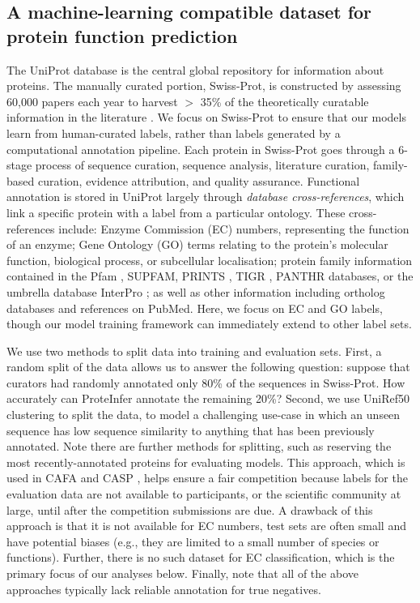 \subsection*{A machine-learning compatible dataset for protein function prediction}
The UniProt database is the central global repository for information about proteins. The manually curated portion, Swiss-Prot, is constructed by assessing $~$60,000 papers each year to harvest $\gt$ 35\% of the theoretically curatable information in the literature \cite{uniprotlatest}. We focus on Swiss-Prot to ensure that our models learn from human-curated labels, rather than labels generated by a computational annotation pipeline. Each protein in Swiss-Prot goes through a 6-stage process of sequence curation, sequence analysis, literature curation, family-based curation, evidence attribution, and quality assurance.
Functional annotation is stored in UniProt largely through \textit{database cross-references}, which link a specific protein with a label from a particular ontology. These cross-references include: Enzyme Commission (EC) numbers, representing the function of an enzyme; Gene Ontology (GO) terms relating to the protein's molecular function, biological process, or subcellular localisation; protein family information contained in the Pfam \citep{pfamlatest}, SUPFAM\citep{supfamlatest}, PRINTS \citep{prints}, TIGR \citep{tigr}, PANTHR \citep{panther} databases, or the umbrella database InterPro \citep{interpro}; as well as other information including ortholog databases and references on PubMed. Here, we focus on EC and GO labels, though our model training framework can immediately extend to other label sets.

We use two methods to split data into training and evaluation sets. First, a random split of the data allows us to answer the following question: suppose that curators had randomly annotated only 80\% of the sequences in Swiss-Prot. How accurately can ProteInfer annotate the remaining 20\%?  Second, we use UniRef50 \citep{suzek2015uniref} clustering to split the data, to model a challenging use-case in which an unseen sequence has low sequence similarity to anything that has been previously annotated. Note there are further methods for splitting, such as reserving the most recently-annotated proteins for evaluating models. This approach, which is used in CAFA and CASP \citep{zhou2019cafa, gillis}, helps ensure a fair competition because labels for the evaluation data are not available to participants, or the scientific community at large, until after the competition submissions are due. A drawback of this approach is that it is not available for EC numbers, test sets are often small and have potential biases (e.g., they are limited to a small number of species or functions). Further, there is no such dataset for EC classification, which is the primary focus of our analyses below. Finally, note that all of the above approaches typically lack reliable annotation for true negatives\citep{warwick2020benchmarking}.

